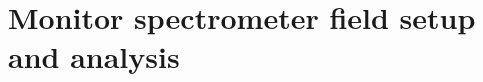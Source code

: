 % 
% 
% 
% 
\clearpage

\section{Monitor spectrometer field setup and analysis}
\label{ch:appendix:sec:A3}


